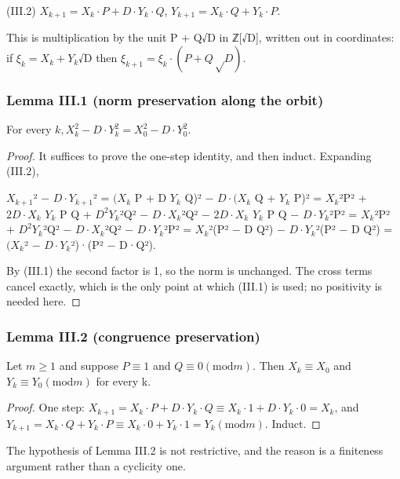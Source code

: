 \documentclass[11pt]{article}
\theoremstyle{plain}
\theoremstyle{definition}
\theoremstyle{remark}
\theoremstyle{plain}
\theoremstyle{definition}
\theoremstyle{remark}
\theoremstyle{plain}
\theoremstyle{definition}
\theoremstyle{remark}
\begin{document}
(III.2)  $X_{k+1} = X_{k}·P + D·Y_{k}·Q$,   $Y_{k+1} = X_{k}·Q + Y_{k}·P$.

This is multiplication by the unit P + Q√D in ℤ[√D], written out in coordinates: if $ξ_{k} = X_{k} + Y_{k}$√D then $ξ_{k+1} = ξ_{k}·(P + Q√D)$.

\subsubsection*{Lemma III.1 (norm preservation along the orbit)}
For every $k, X_{k}^{2} − D·Y_{k}^{2} = X_{0}^{2} − D·Y_{0}^{2}$.

\begin{proof}
It suffices to prove the one-step identity, and then induct. Expanding (III.2),

$X_{k+1}$² − $D·Y_{k+1}$²     = $(X_{k}$ P + D $Y_{k}$ Q)² − $D·(X_{k}$ Q + $Y_{k}$ P)²     = $X_{k}$²P² + $2D·X_{k}$ $Y_{k}$ P Q + $D^{2}Y_{k}$²Q² − $D·X_{k}$²Q² − $2D·X_{k}$ $Y_{k}$ P Q − $D·Y_{k}$²P²     = $X_{k}$²P² + $D^{2}Y_{k}$²Q² − $D·X_{k}$²Q² − $D·Y_{k}$²P²     = $X_{k}$²(P² − D Q²) − $D·Y_{k}$²(P² − D Q²)     = $(X_{k}$² − $D·Y_{k}$²)·(P² − D·Q²).

By (III.1) the second factor is 1, so the norm is unchanged. The cross terms cancel exactly, which is the only point at which (III.1) is used; no positivity is needed here.

\end{proof}
\subsubsection*{Lemma III.2 (congruence preservation)}
Let $m ≥ 1$ and suppose $P ≡ 1$ and $Q ≡ 0 (\mathrm{mod} m)$. Then $X_{k} ≡ X_{0}$ and $Y_{k} ≡ Y_{0} (\mathrm{mod} m)$ for every k.

\begin{proof}
One step: $X_{k+1} = X_{k}·P + D·Y_{k}·Q ≡ X_{k}·1 + D·Y_{k}·0 = X_{k}$, and $Y_{k+1} = X_{k}·Q + Y_{k}·P ≡ X_{k}·0 + Y_{k}·1 = Y_{k} (\mathrm{mod} m)$. Induct.

\end{proof}
The hypothesis of Lemma III.2 is not restrictive, and the reason is a finiteness argument rather than a cyclicity one.
\end{document}
